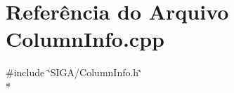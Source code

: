 \section{Referência do Arquivo Column\+Info.\+cpp}
\label{_column_info_8cpp}
{\ttfamily \#include \char`\"{}S\+I\+G\+A/\+Column\+Info.\+h\char`\"{}}\\*

